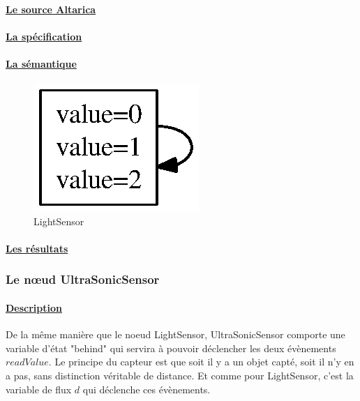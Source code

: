     \paragraph{\underline{Le source Altarica\\}}
    
   
    \paragraph{\underline{La spécification\\}}
    

    \paragraph{\underline{La sémantique\\}}
    \begin{figure}[!ht]
     \begin{center}
      \includegraphics{../src/altarica/LightSensor.eps}
      \caption{LightSensor}
     \end{center}
    \end{figure}

    \paragraph{\underline{Les résultats\\}}
    
    
   
   \subsubsection{Le n\oe{}ud UltraSonicSensor}
   
    \paragraph{\underline{Description\\}}
    De la même manière que le noeud LightSensor, UltraSonicSensor
    comporte une variable d'état "behind" qui servira à pouvoir
    déclencher les deux évènements $readValue$. Le principe du capteur
    est que soit il y a un objet capté, soit il n'y en a pas, sans
    distinction véritable de distance. Et comme pour LightSensor, c'est
    la variable de flux $d$ qui déclenche ces évènements.


